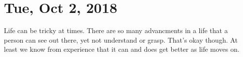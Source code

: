 \section{Tue, Oct 2, 2018}

Life can be tricky at times. There are so many advancments in a life that a person can
see out there, yet not understand or grasp. That's okay though. At least we know from
experience that it can and does get better as life moves on.
